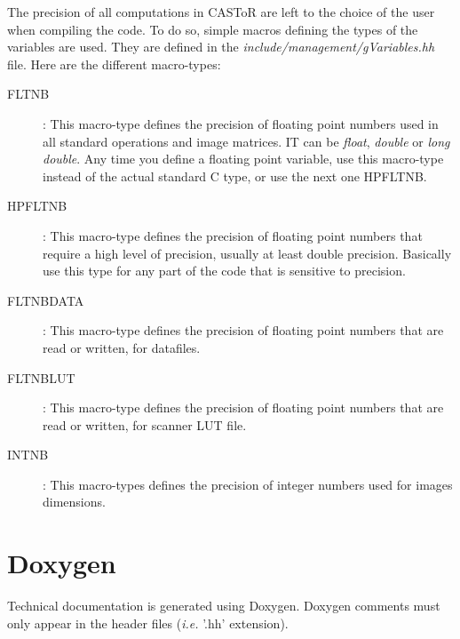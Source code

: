 \documentclass[a4paper, 11pt]{article}
\begin{document}
The precision of all computations in CASToR are left to the choice of the user when compiling the code. To do so, simple macros defining the types of the
variables are used. They are defined in the \textit{include/management/gVariables.hh} file. Here are the different macro-types:
\begin{description}
  \item [FLTNB]: This macro-type defines the precision of floating point numbers used in all standard operations and image matrices. IT can be
                 \textit{float}, \textit{double} or \textit{long double}. Any time you define a floating point variable, use this macro-type
                 instead of the actual standard C type, or use the next one HPFLTNB.
  \item [HPFLTNB]: This macro-type defines the precision of floating point numbers that require a high level of precision, usually at least double precision.
                   Basically use this type for any part of the code that is sensitive to precision.
  \item [FLTNBDATA]: This macro-type defines the precision of floating point numbers that are read or written, for datafiles.
  \item [FLTNBLUT]: This macro-type defines the precision of floating point numbers that are read or written, for scanner LUT file.
  \item [INTNB]: This macro-types defines the precision of integer numbers used for images dimensions.
\end{description}

\section{Doxygen}

Technical documentation is generated using Doxygen. Doxygen comments must only appear in the header files (\textit{i.e.} '.hh' extension).
\end{document}
